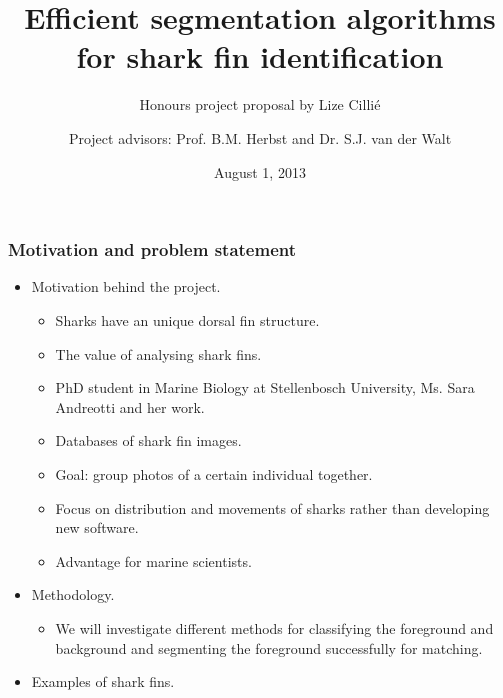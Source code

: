 \documentclass{beamer}
\title{Efficient segmentation algorithms for shark fin identification}
\subtitle{Honours project proposal by Lize Cilli\'{e}}
\author{Project advisors: Prof. B.M.
Herbst and Dr. S.J. van der Walt}
\date{August 1, 2013}
\institute{Division of Applied Mathematics, Stellenbosch University}
\newcommand{\myitem}{\item[$-$]}
\begin{document}
\maketitle


\begin{frame}
\frametitle{Motivation and problem statement}
\begin{itemize}

\item Motivation behind the project.
\begin{itemize}
\myitem Sharks have an unique dorsal fin structure.
\myitem The value of analysing shark fins.
\myitem PhD student in Marine Biology at Stellenbosch University, Ms. Sara
Andreotti and her work.
\myitem Databases of shark fin images.
\myitem Goal: group photos of a certain individual together.
\myitem Focus on distribution and movements of sharks rather than developing new software.
\myitem Advantage for marine scientists.
\end{itemize}
\pause
\item Methodology.
\begin{itemize}
 \myitem We will investigate different methods for classifying the foreground and
background and segmenting the foreground successfully for matching. 
\end{itemize}
\pause
\item Examples of shark fins.
\end{itemize}
\end{frame}
\end{document}
